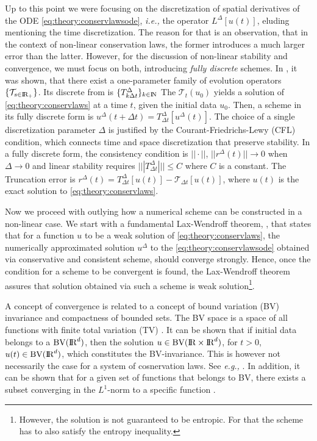 \documentclass[11pt,a4paper,headinclude=true,DIV=14,BCOR=8mm,chapterprefix,listof=totoc,twoside,openright,abstracton]{scrbook}
\begin{document}
Up to this point we were focusing on the discretization of spatial derivatives of the ODE \ref{eq:theory:conservlawsode}, \textit{i.e.,} the operator $L^{\Delta}[u(t)]$, eluding mentioning the time discretization. The reason for that is an observation, that in the context of non-linear conservation laws, the former introduces a much larger error than the latter. However, for the discussion of non-linear stability and convergence, we must focus on both, introducing \textit{fully discrete} schemes.
In \cite{Kruzkov:1970}, it was shown, that there exist a one-parameter family of evolution operators $\{\mathcal{T}_{s\in\text{I\!R}_+}\}$. Its discrete from is $\{ T^{\Delta} _{k \Delta t} \}_{k\in\text{I\!N}}$ The $\mathcal{T}_t(u_0)$ yields a solution of \ref{eq:theory:conservlaws} at a time $t$, given the initial data $u_0$. Then, a scheme in its fully discrete form is $ u^{\Delta}(t+\Delta t) = T^{\Delta} _{\Delta t}[u^{\Delta}(t)]$. The choice of a single discretization parameter $\Delta$ is justified by the Courant-Friedrichs-Lewy (CFL) condition, which connects time and space discretization that preserve stability. 
In a fully discrete form, the consistency condition is $||\cdot||$, $||r^{\Delta}(t)||\rightarrow 0$ when $\Delta\rightarrow 0$ and linear stability requires $|||T^{\Delta}_{\Delta t}||| \leq C$ where $C$ is a constant. The Truncation error is $r^{\Delta}(t) = T^{\Delta}_{\Delta t}[u(t)] - \mathcal{T}_{\Delta t}[u(t)]$, where $u(t)$ is the exact solution to \ref{eq:theory:conservlaws}. 


Now we proceed with outlying how a numerical scheme can be constructed in a non-linear case. We start with a fundamental Lax-Wendroff theorem, \cite{Lax:1960}, that states that for a function $u$ to be a weak solution of \ref{eq:theory:conservlaws}, the numerically approximated solution $u^{\Delta}$ to the \ref{eq:theory:conservlawsode} obtained via conservative and consistent scheme, should converge strongly. Hence, once the condition for a scheme to be convergent is found, the Lax-Wendroff theorem assures that solution obtained via such a scheme is weak solution\footnote{However, the solution is not guaranteed to be entropic. For that the scheme has to also satisfy the entropy inequality.}. 

A concept of convergence is related to a concept of bound variation (BV) invariance and compactness of bounded sets. The BV space is a space of all functions with finite total variation (TV) \cite{Luigi:2002}. It can be shown that if initial data belongs to a $\text{BV}(\text{I\!R}^d)$, then the solution $u \in \text{BV}(\text{I\!R}\times\text{I\!R}^d)$, for $t > 0$, $u(t) \in \text{BV}(\text{I\!R}^d)$, which constitutes the BV-invariance. This is however not necessarily the case for a system of cosnervation laws. See \textit{e.g.,} \cite{Chen:2006}. In addition, it can be shown that for a given set of functions that belongs to BV, there exists a subset converging in the $L^1$-norm to a specific function \cite{Luigi:2002}. 
\end{document}
